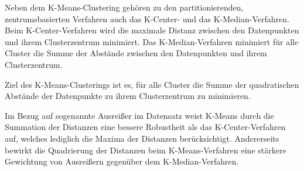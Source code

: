 \documentclass[a4paper,12pt,twoside]{article}
\begin{document}
\begin{center}
	\begin{minipage}{\linewidth}
	\centering
	\end{minipage}
\end{center}

\vspace{\baselineskip}
\par


Neben dem K-Means-Clustering gehören zu den partitionierenden, zentrumsbasierten Verfahren auch das K-Center- und das K-Median-Verfahren. Beim K-Center-Verfahren wird die maximale Distanz zwischen den Datenpunkten und ihrem Clusterzentrum minimiert. Das K-Median-Verfahren minimiert für alle Cluster die Summe der Abstände zwischen den Datenpunkten und ihrem Clusterzentrum. 
\newpage

\par
Ziel des K-Means-Clusterings ist es, für alle Cluster die Summe der quadratischen Abstände der Datenpunkte zu ihrem Clusterzentrum zu minimieren. 
\\
\par
Im Bezug auf sogenannte Ausreißer im Datensatz weist K-Means durch die Summation der Distanzen eine bessere Robustheit  als das K-Center-Verfahren auf, welches lediglich die Maxima der Distanzen berücksichtigt. Andererseits bewirkt die Quadrierung der Distanzen beim K-Means-Verfahren eine stärkere Gewichtung von Ausreißern gegenüber dem K-Median-Verfahren. 
\end{document}
